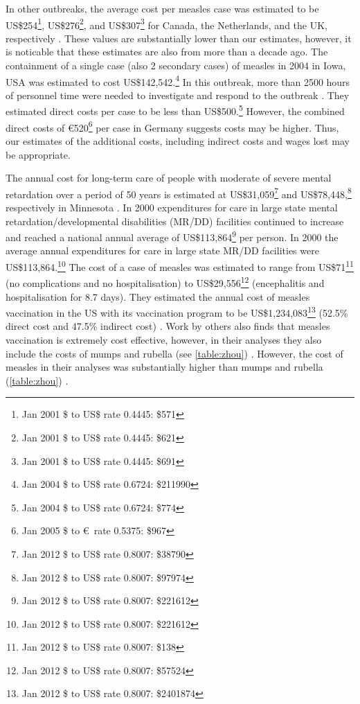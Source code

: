 \documentclass{article}
\begin{document}
In other outbreaks, the average cost per measles case was estimated to be US\$254\footnote{Jan 2001 \$ to US\$ rate 0.4445: \$571}, US\$276\footnote{Jan 2001 \$ to US\$ rate 0.4445: \$621}, and US\$307\footnote{Jan 2001 \$ to US\$ rate 0.4445: \$691} for Canada, the Netherlands, and the UK, respectively  \citep{carabin2}. These values are substantially lower than our estimates, however, it is noticable that these estimates are also from more than a decade ago. The containment of a single case (also 2 secondary cases) of measles in 2004 in Iowa, USA was estimated to cost US\$142,542.\footnote{Jan 2004 \$ to US\$ rate 0.6724: \$211990} In this outbreak, more than 2500 hours of personnel time were needed to investigate and respond to the outbreak \citep{dayan5}. They estimated direct costs per case to be less than US\$500.\footnote{Jan 2004 \$ to US\$ rate 0.6724: \$774} However, the combined direct costs of \euro 520\footnote{Jan 2005 \$ to \euro\ rate 0.5375: \$967} per case in Germany \citep{siedler6} suggests costs may be higher. Thus, our estimates of the additional costs, including indirect costs and wages lost may be appropriate.

The annual cost for long-term care of people with moderate of severe mental retardation over a period of 50 years is estimated at US\$31,059\footnote{Jan 2012 \$ to US\$ rate 0.8007: \$38790} and US\$78,448,\footnote{Jan 2012 \$ to US\$ rate 0.8007: \$97974} respectively in Minnesota \citep{prouty1}. In 2000 expenditures for care in large state mental retardation/developmental disabilities (MR/DD) facilities continued to increase and reached a national annual average of US\$113,864\footnote{Jan 2012 \$ to US\$ rate 0.8007: \$221612} per person. In 2000 the average annual expenditures for care in large state MR/DD facilities were US\$113,864.\footnote{Jan 2012 \$ to US\$ rate 0.8007: \$221612} The cost of a case of measles was estimated to range from US\$71\footnote{Jan 2012 \$ to US\$ rate 0.8007: \$138} (no complications and no hospitalisation) to US\$29,556\footnote{Jan 2012 \$ to US\$ rate 0.8007: \$57524} (encephalitis and hospitalisation for 8.7 days). They estimated the annual cost of measles vaccination in the US with its vaccination program to be US\$1,234,083\footnote{Jan 2012 \$ to US\$ rate 0.8007: \$2401874} (52.5\% direct cost and 47.5\% indirect cost) \citep{zhou4}. Work by others also finds that measles vaccination is extremely cost effective, however, in their analyses they also include the costs of mumps and rubella (see \autoref{table:zhou}) \citep{zhou4}. However, the cost of measles in their analyses was substantially higher than mumps and rubella (\autoref{table:zhou}) \citep{zhou4}.
\end{document}
